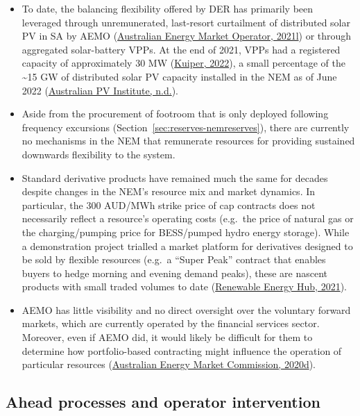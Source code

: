 \documentclass[12pt,a4paper,]{report}
\providecommand{\tightlist}{%
  \setlength{\itemsep}{0pt}\setlength{\parskip}{0pt}}
\begin{document}
\begin{itemize}
\tightlist
\item
  To date, the balancing flexibility offered by DER has primarily been
  leveraged through unremunerated, last-resort curtailment of
  distributed solar PV in SA by AEMO
  (\protect\hyperlink{ref-australianenergymarketoperatorOperatingGridHigh2021}{Australian
  Energy Market Operator, 2021l}) or through aggregated solar-battery
  VPPs. At the end of 2021, VPPs had a registered capacity of
  approximately 30 MW
  (\protect\hyperlink{ref-kuiperWhatStateVirtual2022}{Kuiper, 2022}), a
  small percentage of the \textasciitilde15 GW of distributed solar PV
  capacity installed in the NEM as of June 2022
  (\protect\hyperlink{ref-australianpvinstituteInstalledPVGeneration}{Australian
  PV Institute, n.d.}).
\item
  Aside from the procurement of footroom that is only deployed following
  frequency excursions (Section~\ref{sec:reserves-nemreserves}), there
  are currently no mechanisms in the NEM that remunerate resources for
  providing sustained downwards flexibility to the system.
\item
  Standard derivative products have remained much the same for decades
  despite changes in the NEM's resource mix and market dynamics. In
  particular, the 300 AUD/MWh strike price of cap contracts does not
  necessarily reflect a resource's operating costs (e.g.~the price of
  natural gas or the charging/pumping price for BESS/pumped hydro energy
  storage). While a demonstration project trialled a market platform for
  derivatives designed to be sold by flexible resources (e.g.~a ``Super
  Peak'' contract that enables buyers to hedge morning and evening
  demand peaks), these are nascent products with small traded volumes to
  date
  (\protect\hyperlink{ref-renewableenergyhubRenewableEnergyHub2021}{Renewable
  Energy Hub, 2021}).
\item
  AEMO has little visibility and no direct oversight over the voluntary
  forward markets, which are currently operated by the financial
  services sector. Moreover, even if AEMO did, it would likely be
  difficult for them to determine how portfolio-based contracting might
  influence the operation of particular resources
  (\protect\hyperlink{ref-australianenergymarketcommissionShortTermForward2020}{Australian
  Energy Market Commission, 2020d}).
\end{itemize}

\hypertarget{sec:reserves-ahead_soint}{%
\subsection{Ahead processes and operator
intervention}\label{sec:reserves-ahead_soint}}
\end{document}
